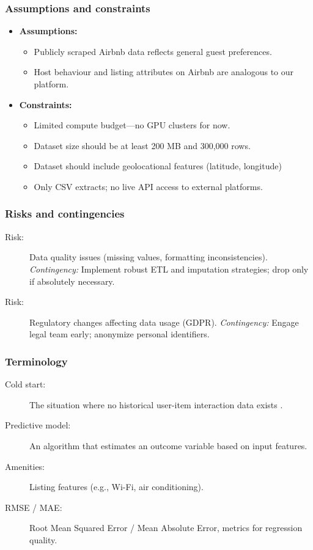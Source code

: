 \subsubsection{Assumptions and constraints}\label{sec:AssumptionsConstraints}
\begin{itemize}
  \item \textbf{Assumptions:}
        \begin{itemize}
          \item Publicly scraped Airbnb data reflects general guest preferences.
          \item Host behaviour and listing attributes on Airbnb are analogous to our platform.
        \end{itemize}
  \item \textbf{Constraints:}
        \begin{itemize}
          \item Limited compute budget---no GPU clusters for now.
          \item Dataset size should be at least 200 MB and 300,000 rows.
          \item Dataset should include geolocational features (latitude, longitude)
          \item Only CSV extracts; no live API access to external platforms.
        \end{itemize}
\end{itemize}

\subsubsection{Risks and contingencies}\label{sec:risksAndContingencies}
\begin{description}
  \item[Risk:] Data quality issues (missing values, formatting inconsistencies).
        \hfill\textit{Contingency:} Implement robust ETL and imputation strategies; drop only if absolutely necessary.
  \item[Risk:] Regulatory changes affecting data usage (GDPR).
        \hfill\textit{Contingency:} Engage legal team early; anonymize personal identifiers.
\end{description}

\subsubsection{Terminology}\label{sec:terminology}
\begin{description}
  \item[Cold start:] The situation where no historical user-item interaction data exists \cite{crispdm2000}.
  \item[Predictive model:] An algorithm that estimates an outcome variable based on input features.
  \item[Amenities:] Listing features (e.g., Wi-Fi, air conditioning).
  \item[RMSE / MAE:] Root Mean Squared Error / Mean Absolute Error, metrics for regression quality.
\end{description}

